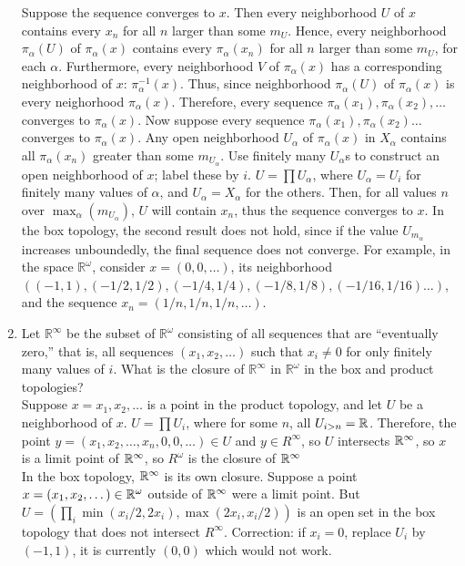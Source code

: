 \documentclass[12pt,letterpaper]{article}
\begin{document}
\begin{enumerate}
  \indent Suppose the sequence converges to $x$. Then every neighborhood $U$ of $x$ contains every $x_n$ for all $n$ larger than some $m_U$. Hence, every neighborhood $\pi_\alpha(U)$ of $\pi_\alpha(x)$ contains every $\pi_\alpha(x_n)$ for all $n$ larger than some $m_U$, for each $\alpha$. Furthermore, every neighborhood $V$ of $\pi_\alpha(x)$ has a corresponding neighborhood of $x$: $\pi^{-1}_\alpha(x)$. Thus, since neighborhood $\pi_\alpha(U)$ of $\pi_\alpha(x)$ is every neighorhood $\pi_\alpha(x)$. Therefore, every sequence $\pi_\alpha(x_1), \pi_\alpha(x_2),\dots$ converges to $\pi_\alpha(x)$.\n
  \indent Now suppose every sequence $\pi_\alpha(x_1), \pi_\alpha(x_2)\dots$ converges to $\pi_\alpha(x)$. Any open neighborhood $U_\alpha$ of $\pi_\alpha(x)$ in $X_\alpha$ contains all $\pi_\alpha(x_n)$ greater than some $m_{U_\alpha}$. Use finitely many $U_\alpha$s to construct an open neighborhood of $x$; label these by $i$. $U=\prod U_\alpha$, where $U_\alpha=U_i$ for finitely many values of $\alpha$, and $U_\alpha=X_\alpha$ for the others. Then, for all values $n$ over $\max_\alpha(m_{U_\alpha})$, $U$ will contain $x_n$, thus the sequence converges to $x$.\n
  \indent In the box topology, the second result does not hold, since if the value $U_{m_\alpha}$ increases unboundedly, the final sequence does not converge. For example, in the space $\mathbb{R}^\omega$, consider $x=(0,0,\dots)$, its neighborhood $((-1,1),\allowbreak (-1/2,1/2),\allowbreak (-1/4,1/4),\allowbreak (-1/8,1/8),\allowbreak (-1/16,1/16)\dots)$, and the sequence $x_n = (1/n,1/n,1/n,\dots)$.
  \item Let $\mathbb{R}^\infty$ be the subset of $\mathbb{R}^\omega$ consisting of all sequences that are ``eventually zero,'' that is, all sequences $(x_1, x_2,\dots)$ such that $x_i\neq 0$ for only finitely many values of $i$. What is the closure of $\mathbb{R}^\infty$ in $\mathbb{R}^\omega$ in the box and product topologies?\\
  Suppose $x=x_1,x_2,\dots$ is a point in the product topology, and let $U$ be a neighborhood of $x$. $U=\prod U_i$, where for some $n$, all $U_{i>n}=\mathbb{R}$. Therefore, the point $y = (x_1,x_2,\dots,x_n,0,0,\dots)\in U$ and $y\in R^\infty$, so $U$ intersects $\mathbb{R}^\infty$, so $x$ is a limit point of $\mathbb{R}^\infty$, so $R^\omega$ is the closure of $\mathbb{R}^\infty$\\
  In the box topology, $\mathbb{R}^\infty$ is its own closure. Suppose a point $x=(x_1,x_2,\dots)\in\mathbb{R}^\omega$ outside of $\mathbb{R}^\infty$ were a limit point. But $U=(\prod_i \min(x_i/2, 2x_i),\max(2x_i,x_i/2))$ is an open set in the box topology that does not intersect $R^\infty$. Correction: if $x_i=0$, replace $U_i$ by $(-1,1)$, it is currently $(0,0)$ which would not work.

\end{enumerate}
\end{document}
